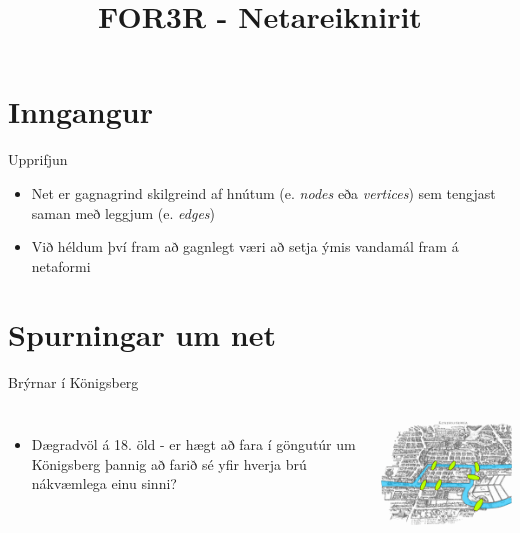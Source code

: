 \documentclass{beamer}
\title{FOR3R - Netareiknirit}
\begin{document}
\begin{frame}
\titlepage
\end{frame}

\section{Inngangur}

\begin{frame}{Upprifjun}
\begin{itemize}
 \item Net er gagnagrind skilgreind af hnútum (e. \emph{nodes} eða \emph{vertices}) sem tengjast saman með leggjum (e. \emph{edges})
 \item Við héldum því fram að gagnlegt væri að setja ýmis vandamál fram á netaformi
\end{itemize}
\end{frame}

\section{Spurningar um net}

\begin{frame}{Brýrnar í Königsberg}
\begin{columns}
\begin{itemize}
 \item Dægradvöl á 18. öld - er hægt að fara í göngutúr um Königsberg þannig að farið sé yfir hverja brú nákvæmlega einu sinni?
\end{itemize}
\includegraphics[width=\linewidth]{Pics/konigsberg1}
\end{columns}
\end{frame}
\end{document}
